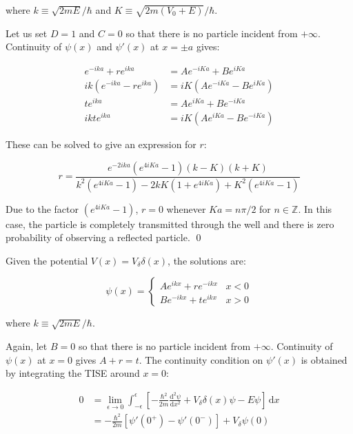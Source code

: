 \documentclass[12pt]{article}
\begin{document}
where $k \equiv \sqrt{2mE}/\hbar$ and $K \equiv \sqrt{2m(V_{0} + E)}/\hbar$.

Let us set $D = 1$ and $C = 0$ so that there is no particle incident from $+\infty$. Continuity of $\psi(x)$ and $\psi'(x)$ at $x = \pm a$ gives:

\begin{equation}
    \begin{split}
        e^{-ika} + re^{ika} &= Ae^{-iKa} + Be^{iKa} \\
        ik(e^{-ika} - re^{ika}) &= iK(Ae^{-iKa} - Be^{iKa}) \\
        te^{ika} &= Ae^{iKa} + Be^{-iKa} \\
        ikt e^{ika} &= iK(Ae^{iKa} - Be^{-iKa})
    \end{split}
\end{equation}

These can be solved to give an expression for $r$:

\begin{equation}
    r = \frac{e^{-2ika} \left( e^{4iKa} - 1 \right) (k - K) (k + K)}{k^{2} \left( e^{4iKa} - 1 \right) - 2kK \left( 1 + e^{4iKa} \right) + K^{2} \left( e^{4iKa} - 1 \right)}
\end{equation}

Due to the factor $(e^{4iKa} - 1)$, $r = 0$ whenever $Ka = n\pi/2$ for $n \in \mathbb{Z}$. In this case, the particle is completely transmitted through the well and there is zero probability of observing a reflected particle.
\qed


Given the potential $V(x) = V_{\delta} \delta(x)$, the solutions are:

\begin{equation}
    \psi(x) =
    \begin{cases}
        Ae^{ikx} + re^{-ikx} & x < 0 \\
        Be^{-ikx} + te^{ikx} & x > 0
    \end{cases}
\end{equation}

where $k \equiv \sqrt{2mE}/\hbar$.

Again, let $B = 0$ so that there is no particle incident from $+\infty$. Continuity of $\psi(x)$ at $x = 0$ gives $A + r = t$. The continuity condition on $\psi'(x)$ is obtained by integrating the TISE around $x = 0$:

\begin{equation}
    \begin{split}
        0 &= \lim_{\epsilon \to 0} \int_{-\epsilon}^{\epsilon} \left[ -\frac{\hbar^{2}}{2m} \frac{\mathrm{d}^{2} \psi}{\mathrm{d}x^{2}} + V_{\delta} \delta(x) \psi - E \psi \right] \, \mathrm{d}x \\
        &= -\frac{\hbar^{2}}{2m} \left[ \psi'(0^{+}) - \psi'(0^{-}) \right] + V_{\delta} \psi(0)
    \end{split}
\end{equation}
\end{document}
